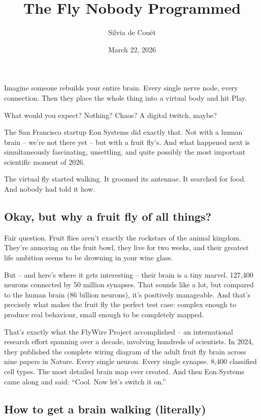 \documentclass[10pt,a4paper]{article}
\begin{document}
\title{The Fly Nobody Programmed}
\date{March 22, 2026}
\author{Silvia de Couët}
\maketitle
    
\thispagestyle{plain}
\setcounter{page}{1}
\linenumbers Imagine someone rebuilds your entire brain. Every single nerve node, every connection. Then they place the whole thing into a virtual body and hit Play.

What would you expect? Nothing? Chaos? A digital twitch, maybe?

The San Francisco startup Eon Systems did exactly that. Not with a human brain – we’re not there yet – but with a fruit fly’s. And what happened next is simultaneously fascinating, unsettling, and quite possibly the most important scientific moment of 2026.

The virtual fly started walking. It groomed its antennae. It searched for food. And nobody had told it how.
\subsection{Okay, but why a fruit fly of all things?}

Fair question. Fruit flies aren’t exactly the rockstars of the animal kingdom. They’re annoying on the fruit bowl, they live for two weeks, and their greatest life ambition seems to be drowning in your wine glass.

But – and here’s where it gets interesting – their brain is a tiny marvel. 127,400 neurons connected by 50 million synapses. That sounds like a lot, but compared to the human brain (86 billion neurons), it’s positively manageable. And that’s precisely what makes the fruit fly the perfect test case: complex enough to produce real behaviour, small enough to be completely mapped.

That’s exactly what the FlyWire Project accomplished – an international research effort spanning over a decade, involving hundreds of scientists. In 2024, they published the complete wiring diagram of the adult fruit fly brain across nine papers in Nature. Every single neuron. Every single synapse. 8,400 classified cell types. The most detailed brain map ever created. And then Eon Systems came along and said: “Cool. Now let’s switch it on.”

\subsection{How to get a brain walking (literally)}
\end{document}
